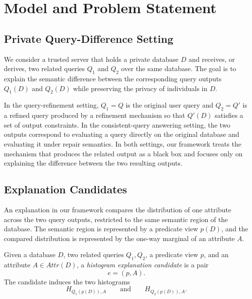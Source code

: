 \section{Model and Problem Statement}\label{sec:model}

\subsection{Private Query-Difference Setting}
\label{subsec:private-query-difference-setting}

We consider a trusted server that holds a private database $D$ and receives, or derives, two related queries $Q_1$ and $Q_2$ over the same database.
The goal is to explain the semantic difference between the corresponding query outputs $Q_1(D)$ and $Q_2(D)$ while preserving the privacy of individuals in $D$.

In the query-refinement setting, $Q_1=Q$ is the original user query and $Q_2=Q'$ is a refined query produced by a refinement mechanism so that $Q'(D)$ satisfies a set of output constraints.
In the consistent-query answering setting, the two outputs correspond to evaluating a query directly on the original database and evaluating it under repair semantics.
In both settings, our framework treats the mechanism that produces the related output as a black box and focuses only on explaining the difference between the two resulting outputs.


\subsection{Explanation Candidates}
\label{subsec:explanation-candidates}

An explanation in our framework compares the distribution of one attribute across the two query outputs, restricted to the same semantic region of the database.
The semantic region is represented by a predicate view $p(D)$, and the compared distribution is represented by the one-way marginal of an attribute $A$.

\begin{definition}
Given a database $D$, two related queries $Q_1,Q_2$, a predicate view $p$, and an attribute $A \in Attr(D)$, a \emph{histogram explanation candidate} is a pair
\[
    e=(p,A).
\]
The candidate induces the two histograms
\[
    H_{Q_1(p(D)),A}
    \qquad\text{and}\qquad
    H_{Q_2(p(D)),A}.
\]
\end{definition}

